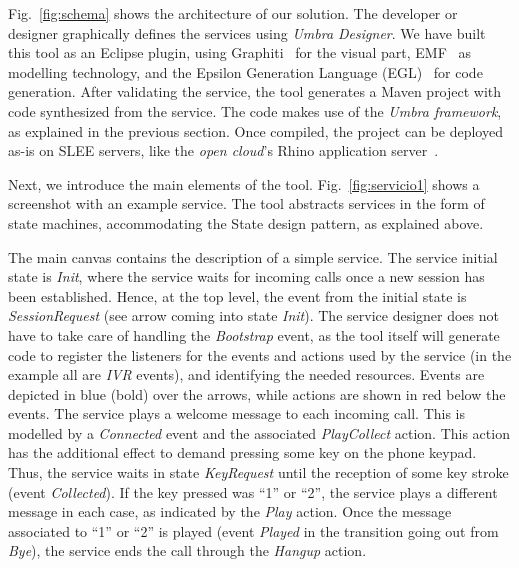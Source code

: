 Fig.~\ref{fig:schema} shows the architecture of our solution. The developer or designer graphically defines
the services using {\em Umbra Designer}. We have built this tool as an Eclipse plugin, using Graphiti~\cite{Graphiti} 
for the visual part, EMF~\cite{EMF} as modelling technology, and the Epsilon Generation Language (EGL)~\cite{EGL} 
for code generation. After validating the service, the tool generates a Maven project with code synthesized from
the service. The code makes use of the {\em Umbra framework}, as explained in the previous section. Once compiled, 
the project can be deployed as-is on SLEE servers, like the {\em open cloud}'s Rhino application server~\cite{rhino}.


Next, we introduce the main elements of the tool. Fig.~\ref{fig:servicio1} shows a screenshot with an example service. 
The tool abstracts services in the form of state machines, accommodating the State design pattern, as explained above.

The main canvas contains the description of a simple service. The service initial state is {\em Init}, where the 
service waits for incoming calls once a new session has been established. Hence, at the top level, the event from the 
initial state is {\em SessionRequest} (see arrow coming into state {\em Init}). The service designer does not 
have to take care of handling the {\em Bootstrap} event, as the tool itself will generate code to register the 
listeners for the events and actions used by the service (in the example all are {\em IVR} events), and identifying 
the needed resources. Events are depicted in blue (bold) over the arrows, while actions are shown in red below 
the events. The service plays a welcome message to each incoming call. This is modelled by a {\em Connected} 
event and the associated {\em PlayCollect} action. This action has the additional effect to demand pressing 
some key on the phone keypad. Thus, the service waits in state {\em KeyRequest} until the reception of some key 
stroke (event {\em Collected}). If the key pressed was ``1'' or ``2'', the service plays a different message 
in each case, as indicated by the {\em Play} action. Once the message associated to ``1'' or ``2'' is played 
(event {\em Played} in the transition going out from {\em Bye}), the service ends the call through the {\em Hangup} 
action.


